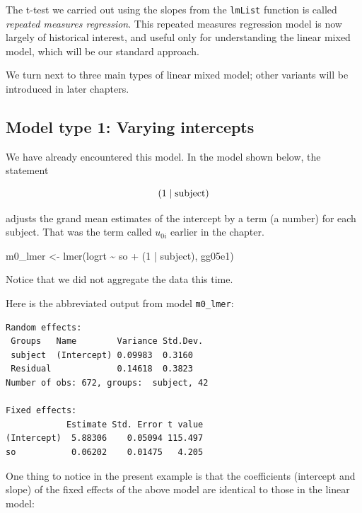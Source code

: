 \documentclass[
  12pt,
]{krantz}
\newenvironment{Shaded}{\begin{snugshade}}{\end{snugshade}}
\newcommand{\DecValTok}[1]{\textcolor[rgb]{0.00,0.00,0.81}{#1}}
\newcommand{\FunctionTok}[1]{\textcolor[rgb]{0.00,0.00,0.00}{#1}}
\newcommand{\NormalTok}[1]{#1}
\newcommand{\OtherTok}[1]{\textcolor[rgb]{0.56,0.35,0.01}{#1}}
\newcommand{\SpecialCharTok}[1]{\textcolor[rgb]{0.00,0.00,0.00}{#1}}
\theoremstyle{definition}
\theoremstyle{definition}
\theoremstyle{definition}
\theoremstyle{definition}
\theoremstyle{remark}
\begin{document}
The t-test we carried out using the slopes from the \texttt{lmList} function is called \emph{repeated measures regression}. This repeated measures regression model is now largely of historical interest, and useful only for understanding the linear mixed model, which will be our standard approach.

We turn next to three main types of linear mixed model; other variants will be introduced in later chapters.

\hypertarget{model-type-1-varying-intercepts}{%
\subsection{Model type 1: Varying intercepts}\label{model-type-1-varying-intercepts}}

We have already encountered this model. In the model shown below, the statement

\begin{equation}
(1 \mid \hbox{subject}) 
\end{equation}

adjusts the grand mean estimates of the intercept by a term (a number) for each subject. That was the term called \(u_{0i}\) earlier in the chapter.

\begin{Shaded}
\begin{Highlighting}[]
\NormalTok{m0\_lmer }\OtherTok{\textless{}{-}} \FunctionTok{lmer}\NormalTok{(logrt }\SpecialCharTok{\textasciitilde{}}\NormalTok{ so }\SpecialCharTok{+}\NormalTok{ (}\DecValTok{1} \SpecialCharTok{|}\NormalTok{ subject), gg05e1)}
\end{Highlighting}
\end{Shaded}

Notice that we did not aggregate the data this time.

Here is the abbreviated output from model \texttt{m0\_lmer}:

\begin{verbatim}
Random effects:
 Groups   Name        Variance Std.Dev.
 subject  (Intercept) 0.09983  0.3160  
 Residual             0.14618  0.3823  
Number of obs: 672, groups:  subject, 42

Fixed effects:
            Estimate Std. Error t value
(Intercept)  5.88306    0.05094 115.497
so           0.06202    0.01475   4.205
\end{verbatim}

One thing to notice in the present example is that the coefficients (intercept and slope) of the fixed effects of the above model are identical to those in the linear model:
\end{document}
